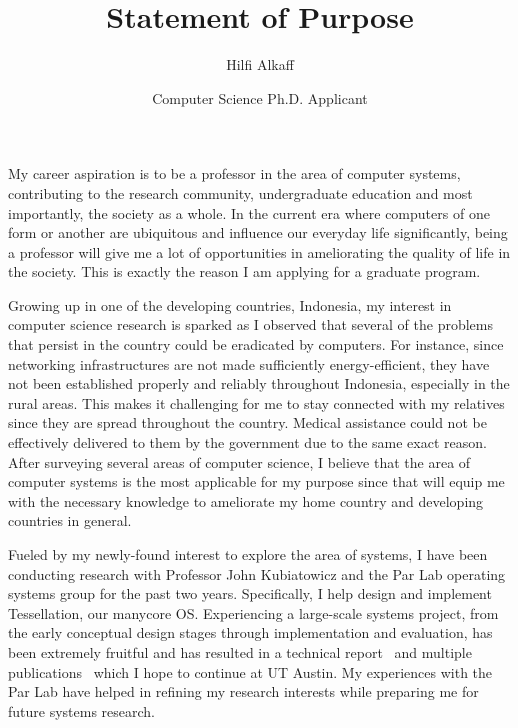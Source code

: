 \documentclass[12pt]{article}
\title{Statement of Purpose}
\author{Hilfi Alkaff}
\date{Computer Science Ph.D. Applicant}
\begin{document}
  \maketitle%

My career aspiration is to be a professor in the area of computer systems, contributing to the research community, undergraduate education and most importantly, the society as a whole. In the current era where computers of one form or another are ubiquitous and influence our everyday life significantly, being a professor will give me a lot of opportunities in ameliorating the quality of life in the society. This is exactly the reason I am applying for a graduate program. \newline

Growing up in one of the developing countries, Indonesia, my interest in computer science research is sparked as I observed that several of the problems that persist in the country could be eradicated by computers. For instance, since networking infrastructures are not made sufficiently energy-efficient, they have not been established properly and reliably throughout Indonesia, especially in the rural areas. This makes it challenging for me to stay connected with my relatives since they are spread throughout the country. Medical assistance could not be effectively delivered to them by the government due to the same exact reason. After surveying several areas of computer science, I believe that the area of computer systems is the most applicable for my purpose since that will equip me with the necessary knowledge to ameliorate my home country and developing countries in general. \newline

Fueled by my newly-found interest to explore the area of systems, I have been conducting research with Professor John Kubiatowicz and the Par Lab operating systems group for the past two years. Specifically, I help design and implement Tessellation, our manycore OS. Experiencing a large-scale systems project, from the early conceptual design stages through implementation and evaluation, has been extremely fruitful and has resulted in a technical report~\cite{tess_retreat2010} and multiple publications~\cite{tess_hotchip, tess_eurosys, tess_cata} which I hope to continue at UT Austin. My experiences with the Par Lab have helped in refining my research interests while preparing me for future systems research. \newline
\end{document}
